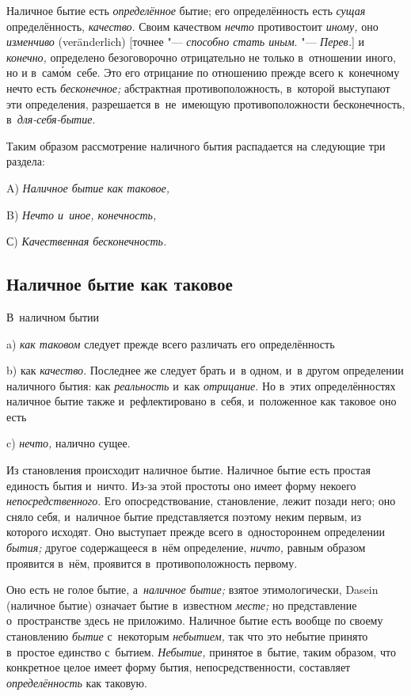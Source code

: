 Наличное бытие есть {\em определённое} бытие; его определённость есть
{\em сущая} определённость, {\em качество}. Своим качеством {\em нечто}
противостоит {\em иному,} оно {\em изменчиво} (ver\-änder\-lich)
[точнее "--- {\em способно стать иным}. "--- {\em Перев.}] и {\em конечно,}
определено безоговорочно отрицательно не только в~отношении иного, но и
в~сам\'{о}м~себе. Это его отрицание по отношению прежде всего к~конечному нечто
есть {\em бесконечное;} абстрактная противоположность, в~которой выступают эти
определения, разрешается в~не~имеющую противоположности бесконечность,
в~{\em для-себя-бытие}.

Таким образом рассмотрение наличного бытия
распадается на следующие три раздела:

A) {\em Наличное бытие как таковое,}

B) {\em Нечто и~иное, конечность,}

С) {\em Качественная бесконечность.}

\subsection{Наличное бытие как таковое}

В~наличном бытии\nopagebreak

a) {\em как таковом} следует прежде всего различать его определённость

b) как {\em качество}. Последнее же следует брать и~в одном, и~в другом
определении наличного бытия: как {\em реальность} и~как {\em отрицание}.
Но в~этих определённостях наличное бытие также и~рефлектировано в~себя,
и~положенное как таковое оно есть

c) {\em нечто,} налично сущее.


Из становления происходит наличное бытие. Наличное бытие есть простая единость
бытия и~ничто. Из-за этой простоты оно имеет форму некоего
{\em непосредственного}. Его опосредствование, становление, лежит позади него;
оно сняло себя, и~наличное бытие представляется поэтому неким первым, из
которого исходят. Оно выступает прежде всего в~одностороннем определении
{\em бытия;} другое содержащееся в~нём определение, {\em ничто,} равным
образом проявится в~нём, проявится в~противоположность первому.

Оно есть не голое бытие, а~{\em наличное бытие;} взятое этимологически, Dasein
(наличное бытие) означает бытие в~известном {\em месте;} но представление
о~пространстве здесь не приложимо. Наличное бытие есть вообще по своему
становлению {\em бытие} с~некоторым {\em небытием,} так что это небытие принято
в~простое единство с~бытием. {\em Небытие,} принятое в~бытие, таким образом,
что конкретное целое имеет форму бытия, непосредственности, составляет
{\em определённость} как таковую.

